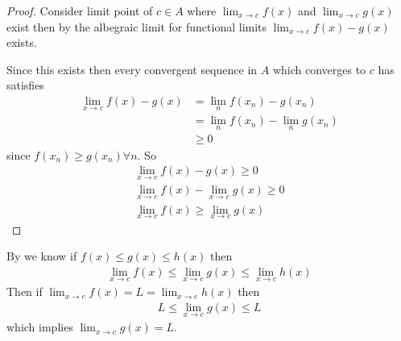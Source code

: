 \begin{proof}
    Consider limit point of $c\in A$ where $\lim_{x\rightarrow c} f(x)$
    and $\lim_{x\rightarrow c} g(x)$ exist then by the albegraic limit \Thm
    for functional limits $\lim_{x\rightarrow c} f(x) - g(x)$ exists.

    Since this exists then every convergent sequence in $A$ which converges to 
    $c$ has satisfies
    \begin{align*}
        \lim_{x\rightarrow c} f(x) - g(x) &= \lim_n f(x_n) - g(x_n) \\
                                            &= \lim_n f(x_n) - \lim_n g(x_n) \\
                                            &\geq 0
    \end{align*}
    since $f(x_n) \geq g(x_n) \forall n$. So
    \begin{gather*}
        \lim_{x\rightarrow c} f(x) - g(x) \geq 0 \\
        \lim_{x\rightarrow c} f(x) - \lim_{x\rightarrow c} g(x) \geq 0 \\
        \lim_{x\rightarrow c} f(x) \geq  \lim_{x\rightarrow c} g(x)
    \end{gather*}
\end{proof}

By  we know if $f(x) \leq g(x) \leq h(x)$ then 
\begin{align}
    \lim_{x\rightarrow c} f(x) \leq \lim_{x\rightarrow c} g(x) \leq \lim_{x\rightarrow c} h(x)
\end{align}
Then if $\lim_{x\rightarrow c} f(x) = L = \lim_{x\rightarrow c} h(x)$ then 
\begin{align}
    L \leq \lim_{x\rightarrow c} g(x) \leq L
\end{align}
which implies $\lim_{x\rightarrow c} g(x) = L$.